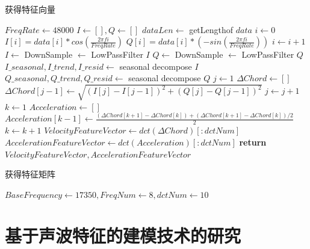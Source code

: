 \begin{algorithm}
\caption{获得特征向量}
\label{alg:get-feature-vector}
\begin{algorithmic}[1]
\State $FreqRate \gets 48000$           
\State $I \gets [], Q \gets []$  
\State $dataLen \gets$ getLengthof $data$  
\State $i \gets 0$
 
\State $I[i]=data[i]*cos(\frac{2\pi fi}{FreqRate})$
\State $Q[i]=data[i]*(-sin(\frac{2\pi fi}{FreqRate}))$
\State $i \gets i + 1$
\EndWhile\label{euclidendwhile}
\State $I \gets $ DownSample $\gets $ LowPassFilter $I$   
\State $Q \gets $ DownSample $\gets $ LowPassFilter $Q$   
\State $I\_seasonal,I\_trend,I\_resid \gets$ seasonal decompose $I$      
\State $Q\_seasonal,Q\_trend,Q\_resid \gets$ seasonal decompose $Q$  
\State $j \gets 1$
\State $\Delta Chord \gets []$
 
\State $\Delta Chord[j-1] \gets \sqrt{(I[j]-I[j-1])^{2} + (Q[j]-Q[j-1])^{2}}$
\State $j \gets j + 1$
\EndWhile\label{euclidendwhile}
\State $k \gets 1$
\State $Acceleration \gets []$
 
\State $Acceleration[k-1] \gets \frac{(\Delta Chord[k+1] - \Delta Chord[k]) + (\Delta Chord[k+1] - \Delta Chord[k])/2}{2}$
\State $k \gets k + 1$
\EndWhile\label{euclidendwhile}
\State $VelocityFeatureVector \gets dct(\Delta Chord)[:dctNum]$
\State $AccelerationFeatureVector \gets dct(Acceleration)[:dctNum]$
\State \textbf{return} $VelocityFeatureVector,AccelerationFeatureVector$
\EndProcedure
\end{algorithmic}
\end{algorithm}

\begin{algorithm}[!htp]
\caption{获得特征矩阵}
\label{alg:get-feature-matrix}
\begin{algorithmic}[1]
 
\State $BaseFrequency \gets 17350, FreqNum \gets 8, dctNum \gets 10$ 
\EndProcedure
\end{algorithmic}
\end{algorithm}

\section{基于声波特征的建模技术的研究}
